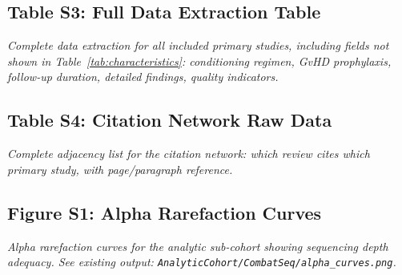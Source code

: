 \documentclass[11pt,a4paper]{article}
\newcommand{\placeholder}[1]{\par\noindent\colorbox{gray!15}{\parbox{\dimexpr\linewidth-2\fboxsep}{%
  \small\textit{#1}}}\par\medskip}
\begin{document}
\subsection{Table S3: Full Data Extraction Table}
\placeholder{Complete data extraction for all included primary studies, including fields not shown in Table~\ref{tab:characteristics}: conditioning regimen, GvHD prophylaxis, follow-up duration, detailed findings, quality indicators.}

\subsection{Table S4: Citation Network Raw Data}
\placeholder{Complete adjacency list for the citation network: which review cites which primary study, with page/paragraph reference.}

\subsection{Figure S1: Alpha Rarefaction Curves}
\placeholder{Alpha rarefaction curves for the analytic sub-cohort showing sequencing depth adequacy. See existing output: \texttt{AnalyticCohort/CombatSeq/alpha\_curves.png}.}
\end{document}
